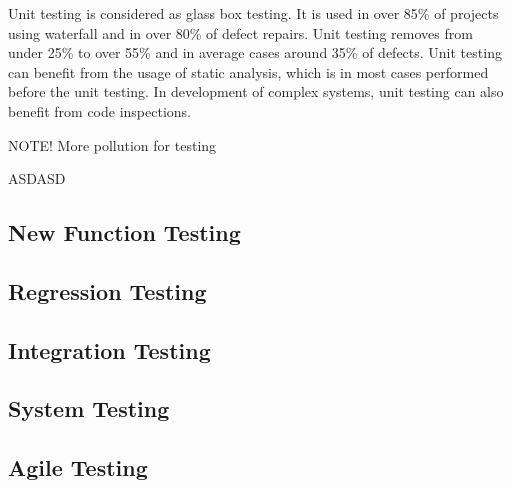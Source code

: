  Unit testing is considered as glass box testing. It is used in over 85\% of projects using waterfall and in over 80\% of defect repairs. Unit testing removes from under 25\% to over 55\% and in average cases around 35\% of defects. Unit testing can benefit from the usage of static analysis, which is in most cases performed before the unit testing. In development of complex systems, unit testing can also benefit from code inspections.


NOTE! More pollution for testing




ASDASD

 \subsection{New Function Testing}

 \subsection{Regression Testing}

 \subsection{Integration Testing}

 \subsection{System Testing}

 \subsection{Agile Testing}